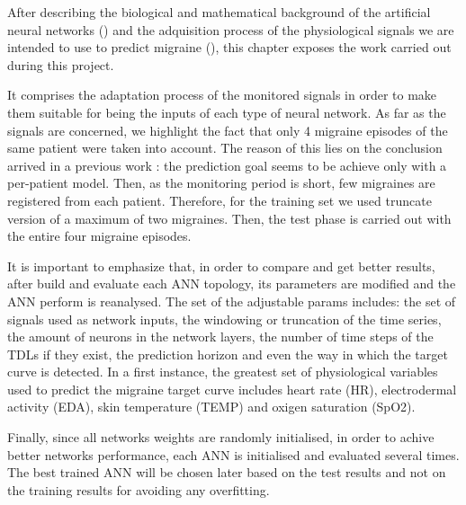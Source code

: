 \label{chapter:application}

After describing the biological and mathematical background of the artificial neural networks () and the adquisition process of the physiological signals we are intended to use to predict migraine (), this chapter exposes the work carried out during this project.


It comprises the adaptation process of the monitored signals in order to make them suitable for being the inputs of each type of neural network. 
As far as the signals are concerned, we highlight the fact that only 4 migraine episodes of the same patient were taken into account. 
The reason of this lies on the conclusion arrived in a previous work \cite{Irene:PFC:2014}: 
the prediction goal seems to be achieve only with a per-patient model. 
Then, as the monitoring period is short, few migraines are registered from each patient.
Therefore, for the training set we used truncate version of a maximum of two migraines. Then, the test phase is carried out with the entire four migraine episodes.


It is important to emphasize that,
in order to compare and get better results,
after build and evaluate each ANN topology,
its parameters are modified and the ANN perform is reanalysed. 
The set of the adjustable params includes:
the set of signals used as network inputs,
the windowing or truncation of the time series,
the amount of neurons in the network layers, 
the number of time steps of the TDLs if they exist,
the prediction horizon  
and even the way in which the target curve is detected.
In a first instance, the greatest set of physiological variables used to predict the migraine target curve includes heart rate (HR), electrodermal activity (EDA), skin temperature (TEMP) and oxigen saturation (SpO2).

Finally, since all networks weights are randomly initialised, 
in order to achive better networks performance, each ANN is initialised and evaluated several times. The best trained ANN will be chosen later based on the test results and not on the training results for avoiding any overfitting.